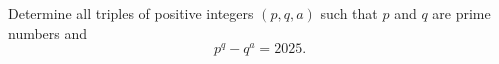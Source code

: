 Determine all triples of positive integers $(p, q, a)$ such that $p$ and $q$ are prime numbers and
$$p^q - q^a = 2025.$$
